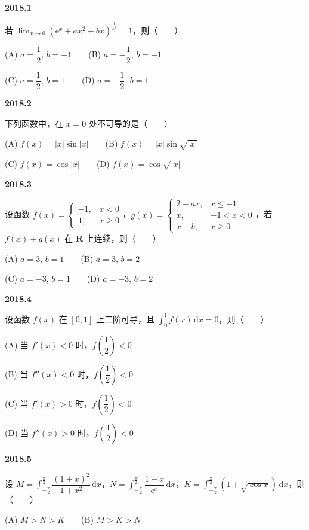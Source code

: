 \documentclass[UTF8,12pt,fontset=windows]{ctexart}
\begin{document}
{\large\bfseries 2018.1}

若 $\lim_{x\to 0}(\mathrm{e}^x + ax^2 + bx)^{\frac{1}{x^2}} = 1$，则（　　）

(A) $a = \dfrac{1}{2},\, b = -1$　　(B) $a = -\dfrac{1}{2},\, b = -1$

(C) $a = \dfrac{1}{2},\, b = 1$　　(D) $a = -\dfrac{1}{2},\, b = 1$

\vfill
\newpage
{\large\bfseries 2018.2}

下列函数中，在 $x = 0$ 处不可导的是（　　）

(A) $f(x) = |x|\sin|x|$　　(B) $f(x) = |x|\sin\sqrt{|x|}$

(C) $f(x) = \cos|x|$　　(D) $f(x) = \cos\sqrt{|x|}$

\vfill
\newpage
{\large\bfseries 2018.3}

设函数 $f(x) = \begin{cases} -1, & x < 0 \\ 1, & x \geqslant 0 \end{cases}$，$g(x) = \begin{cases} 2 - ax, & x \leqslant -1 \\ x, & -1 < x < 0 \\ x - b, & x \geqslant 0 \end{cases}$，若 $f(x) + g(x)$ 在 $\mathbf{R}$ 上连续，则（　　）

(A) $a = 3,\, b = 1$　　(B) $a = 3,\, b = 2$

(C) $a = -3,\, b = 1$　　(D) $a = -3,\, b = 2$

\vfill
\newpage
{\large\bfseries 2018.4}

设函数 $f(x)$ 在 $[0,1]$ 上二阶可导，且 $\int_{0}^{1} f(x)\,\mathrm{d}x = 0$，则（　　）

(A) 当 $f'(x) < 0$ 时，$f\left(\dfrac{1}{2}\right) < 0$

(B) 当 $f''(x) < 0$ 时，$f\left(\dfrac{1}{2}\right) < 0$

(C) 当 $f'(x) > 0$ 时，$f\left(\dfrac{1}{2}\right) < 0$

(D) 当 $f''(x) > 0$ 时，$f\left(\dfrac{1}{2}\right) < 0$

\vfill
\newpage
{\large\bfseries 2018.5}

设 $M = \int_{-\frac{\pi}{2}}^{\frac{\pi}{2}} \dfrac{(1+x)^2}{1+x^2}\,\mathrm{d}x$，$N = \int_{-\frac{\pi}{2}}^{\frac{\pi}{2}} \dfrac{1+x}{\mathrm{e}^x}\,\mathrm{d}x$，$K = \int_{-\frac{\pi}{2}}^{\frac{\pi}{2}} (1 + \sqrt{\cos x})\,\mathrm{d}x$，则（　　）

(A) $M > N > K$　　(B) $M > K > N$
\end{document}

